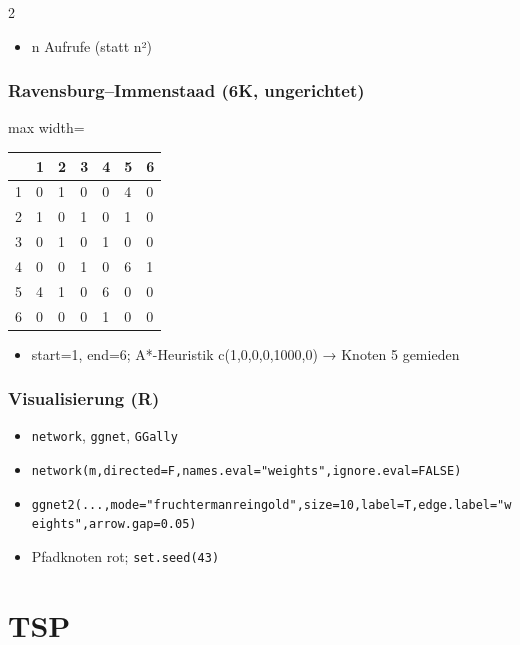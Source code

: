 \documentclass[10pt, a4paper]{article}
\begin{document}
\begin{multicols}{2}
\begin{itemize}
  \item n Aufrufe (statt n²)
\end{itemize}


\subsubsection{Ravensburg–Immenstaad (6K, ungerichtet)}

{\footnotesize
\begin{adjustbox}{max width=\linewidth}
{\scriptsize
\begin{tabular}{lllllll}
\toprule
\textbf{} & \textbf{1} & \textbf{2} & \textbf{3} & \textbf{4} & \textbf{5} & \textbf{6} \\
\midrule
1 & 0 & 1 & 0 & 0 & 4 & 0 \\
2 & 1 & 0 & 1 & 0 & 1 & 0 \\
3 & 0 & 1 & 0 & 1 & 0 & 0 \\
4 & 0 & 0 & 1 & 0 & 6 & 1 \\
5 & 4 & 1 & 0 & 6 & 0 & 0 \\
6 & 0 & 0 & 0 & 1 & 0 & 0 \\
\bottomrule
\end{tabular}
}
\end{adjustbox}
}


\begin{itemize}
  \item start=1, end=6; A*-Heuristik c(1,0,0,0,1000,0) → Knoten 5 gemieden
\end{itemize}


\subsubsection{Visualisierung (R)}
\begin{itemize}
  \item \texttt{network}, \texttt{ggnet}, \texttt{GGally}
  \item \texttt{network(m,directed=F,names.eval="weights",ignore.eval=FALSE)}
  \item \texttt{ggnet2(...,mode="fruchtermanreingold",size=10,label=T,edge.label="weights",arrow.gap=0.05)}
  \item Pfadknoten rot; \texttt{set.seed(43)}
\end{itemize}


\section{TSP}


\end{multicols}
\end{document}
